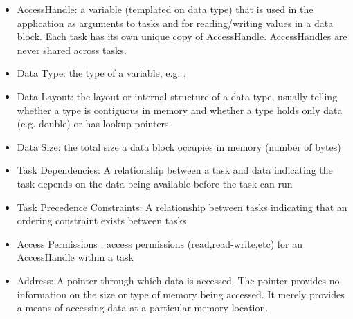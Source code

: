 \begin{itemize}
\item AccessHandle: a variable (templated on data type) that is used in the application as arguments to tasks and for reading/writing values in a data block.
Each task has its own unique copy of AccessHandle. AccessHandles are never shared across tasks.
\item Data Type: the type of a variable, e.g. , 
\item Data Layout: the layout or internal structure of a data type, usually telling whether a type is contiguous in memory and whether a type holds only data (e.g. double) or has lookup pointers
\item Data Size: the total size a data block occupies in memory (number of bytes)
\item Task Dependencies: A relationship between a task and data indicating the task depends on the data being available before the task can run
\item Task Precedence Constraints:  A relationship between tasks indicating that an ordering constraint exists between tasks
\item Access Permissions : access permissions (read,read-write,etc) for an AccessHandle within a task
\item Address: A pointer through which data is accessed. 
The pointer provides no information on the size or type of memory being accessed.
It merely provides a means of accessing data at a particular memory location.
\end{itemize}

